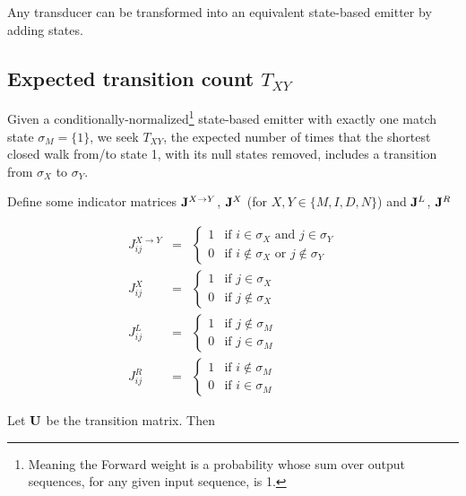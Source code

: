 \documentclass{article}
\begin{document}
Any transducer can be transformed into an equivalent state-based emitter by adding states.

\subsection{Expected transition count $T_{XY}$}

Given a conditionally-normalized\footnote{Meaning the Forward weight is a probability whose sum over output sequences, for any given input sequence, is 1.}
state-based emitter with exactly one match state $\sigma_M = \{ 1 \}$,
we seek $T_{XY}$, the expected number of times that the shortest closed walk from/to state 1,
with its null states removed, includes a transition from $\sigma_X$ to $\sigma_Y$.

\newcommand\nottomatch{L}
\newcommand\notfrommatch{R}
\newcommand\tox{X}
\newcommand\tonull{N}
\newcommand\xtoy{{X \to Y}}

Define some indicator matrices
${\bf J}^\xtoy$,
${\bf J}^\tox$
(for $X,Y \in \{ M, I, D, N \}$) and
${\bf J}^\nottomatch$,
${\bf J}^\notfrommatch$

\begin{eqnarray*}
  J^\xtoy_{ij} & = & \left\{ \begin{array}{ll} 1 & \mbox{if $i \in \sigma_X$ and $j \in \sigma_Y$} \\ 0 & \mbox{if $i \notin \sigma_X$ or $j \notin \sigma_Y$} \end{array} \right. \\
  J^\tox_{ij} & = & \left\{ \begin{array}{ll} 1 & \mbox{if $j \in \sigma_X$} \\ 0 & \mbox{if $j \notin \sigma_X$} \end{array} \right. \\
  J^\nottomatch_{ij} & = & \left\{ \begin{array}{ll} 1 & \mbox{if $j \notin \sigma_M$} \\ 0 & \mbox{if $j \in \sigma_M$} \end{array} \right. \\
  J^\notfrommatch_{ij} & = & \left\{ \begin{array}{ll} 1 & \mbox{if $i \notin \sigma_M$} \\ 0 & \mbox{if $i \in \sigma_M$} \end{array} \right.
\end{eqnarray*}

Let ${\bf U}$ be the transition matrix.
Then
\end{document}
